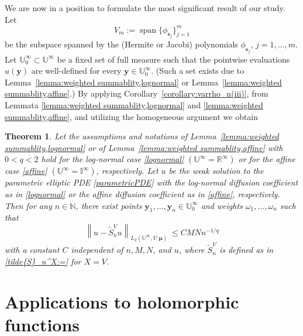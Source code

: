 \documentclass[11pt]{article}
\newtheorem{theorem}{Theorem}[section]
\numberwithin{equation}{section}
\theoremstyle{definition}
\theoremstyle{remark}
\newcommand{\norm}[2]{\left\|{#1}\right\|_{#2}}
\newcommand{\bs}{{\boldsymbol{s}}}
\newcommand{\by}{{\boldsymbol{y}}}
\newcommand{\bmu}{{\boldsymbol{\mu}}}
\def\NN{{\mathbb N}}
\def\NN{{\mathbb N}}
\def\IIi{{\mathbb I}^\infty}
\def\RRi{{\mathbb R}^\infty}
\def\UUi{{\mathbb U}^{\infty}}
\def\NN{{\mathbb N}}
\begin{document}
 		
 		We are now in a position to formulate the most significant result of our study.
 		Let 
 		$$
 		V_m := \operatorname{span}\{\phi_{\bs_j}\}_{j=1}^{m}
 		$$
 		 be the subspace spanned by the (Hermite or Jacobi) polynomials $\phi_{\bs_j}$, $j=1,...,m$.
 		 {Let $\UUi_0 \subset \UUi$ be a fixed set of full measure such  that the pointwise evaluations  $u(\by)$ are  well-defined for every $\by \in \UUi_0$. (Such a set exists due to Lemma~\ref{lemma:weighted summablity,lognormal} or Lemma~\ref{lemma:weighted summablity,affine}.)}
 	By applying Corollary~\ref{corollary:varrho_n(iii)}, from Lemmata \ref{lemma:weighted summablity,lognormal} and
 	\ref{lemma:weighted summablity,affine}, and utilizing the homogeneous argument we obtain
 	
 	\begin{theorem}\label{theorem:sampling-lognormal-affine(iii)}
 		Let the assumptions and notations of Lemma~\ref{lemma:weighted summablity,lognormal} or 
 		of Lemma~\ref{lemma:weighted summablity,affine} with $0 < q < 2$ hold for the log-normal case \eqref{lognormal} $(\UUi = \RRi)$ or for the affine case \eqref{affine} $(\UUi = \IIi)$, respectively. 
 {Let  $u$ be the weak solution to the parametric elliptic PDE \eqref{parametricPDE}  with the log-normal diffusion coefficient as in \eqref{lognormal} or the affine diffusion coefficient as in 
 	\eqref{affine}, respectively.}  Then for any $n \in \NN$, there exist points 
$\by_1, \dots, \by_n \in \UUi_0$ and weights  $\omega_1, \dots, \omega_n$ such that 
	\begin{equation*}
	\norm{u - \tilde{S}_n^V u}{L_2(\UUi,V;\bmu)}
	\ \le C MN n^{-1/q}
\end{equation*}
    with a constant $C$ independent of $n,M,N$, and $u$,
	where  
$\tilde{S}_n^V$ is defined as in \eqref{tilde{S}_n^X:=} for $X=V$.
 	\end{theorem}		
 	
 	\section{Applications to holomorphic functions} 
\label{Applications to holomorphic functions}
\end{document}
